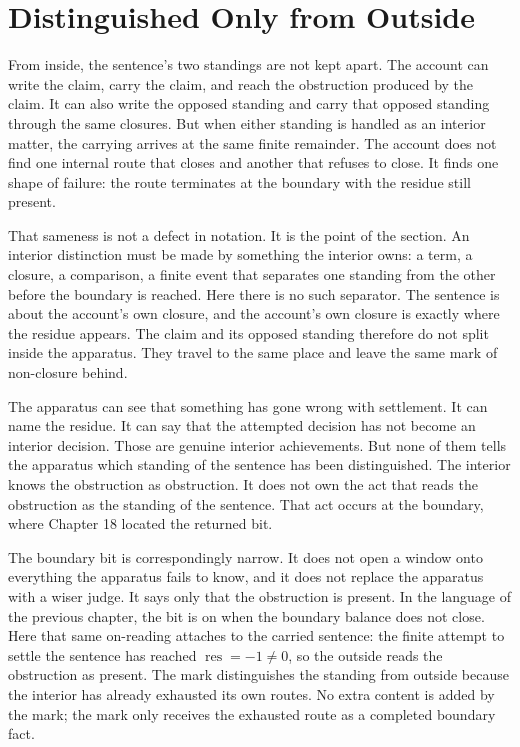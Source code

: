 \section{Distinguished Only from Outside}

From inside, the sentence's two standings are not kept apart. The account can write the claim,
carry the claim, and reach the obstruction produced by the claim. It can also write the opposed
standing and carry that opposed standing through the same closures. But when either standing is
handled as an interior matter, the carrying arrives at the same finite remainder. The account
does not find one internal route that closes and another that refuses to close. It finds one
shape of failure: the route terminates at the boundary with the residue still present.

That sameness is not a defect in notation. It is the point of the section. An interior
distinction must be made by something the interior owns: a term, a closure, a comparison, a
finite event that separates one standing from the other before the boundary is reached. Here
there is no such separator. The sentence is about the account's own closure, and the account's
own closure is exactly where the residue appears. The claim and its opposed standing therefore
do not split inside the apparatus. They travel to the same place and leave the same mark of
non-closure behind.

The apparatus can see that something has gone wrong with settlement. It can name the residue. It
can say that the attempted decision has not become an interior decision. Those are genuine
interior achievements. But none of them tells the apparatus which standing of the sentence has
been distinguished. The interior knows the obstruction as obstruction. It does not own the act
that reads the obstruction as the standing of the sentence. That act occurs at the boundary,
where Chapter 18 located the returned bit.

The boundary bit is correspondingly narrow. It does not open a window onto everything the
apparatus fails to know, and it does not replace the apparatus with a wiser judge. It says only
that the obstruction is present. In the language of the previous chapter, the bit is on when the
boundary balance does not close. Here that same on-reading attaches to the carried sentence:
the finite attempt to settle the sentence has reached \(\operatorname{res}=-1\neq0\), so the
outside reads the obstruction as present. The mark distinguishes the standing from outside
because the interior has already exhausted its own routes. No extra content is added by the
mark; the mark only receives the exhausted route as a completed boundary fact.

